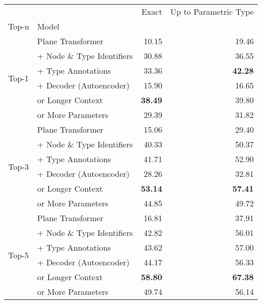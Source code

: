 \begin{tabular}{llrr}
\toprule
 &  & Exact & Up to Parametric Type \\
Top-n & Model &  &  \\
\midrule
\multirow[c]{6}{*}{Top-1} & Plane Transformer & 10.15 & 19.46 \\
 & + Node \& Type Identifiers & 30.88 & 36.55 \\
 & + Type Annotations & 33.36 & \bfseries 42.28 \\
 & + Decoder (Autoencoder) & 15.90 & 16.65 \\
 & or Longer Context & \bfseries 38.49 & 39.80 \\
 & or More Parameters & 29.39 & 31.82 \\
\cline{1-4}
\multirow[c]{6}{*}{Top-3} & Plane Transformer & 15.06 & 29.40 \\
 & + Node \& Type Identifiers & 40.33 & 50.37 \\
 & + Type Annotations & 41.71 & 52.90 \\
 & + Decoder (Autoencoder) & 28.26 & 32.81 \\
 & or Longer Context & \bfseries 53.14 & \bfseries 57.41 \\
 & or More Parameters & 44.85 & 49.72 \\
\cline{1-4}
\multirow[c]{6}{*}{Top-5} & Plane Transformer & 16.81 & 37.91 \\
 & + Node \& Type Identifiers & 42.82 & 56.01 \\
 & + Type Annotations & 43.62 & 57.00 \\
 & + Decoder (Autoencoder) & 44.17 & 56.33 \\
 & or Longer Context & \bfseries 58.80 & \bfseries 67.38 \\
 & or More Parameters & 49.74 & 56.14 \\
\cline{1-4}
\bottomrule
\end{tabular}

